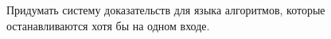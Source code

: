 Придумать систему доказательств для языка алгоритмов, которые останавливаются хотя бы на одном входе.